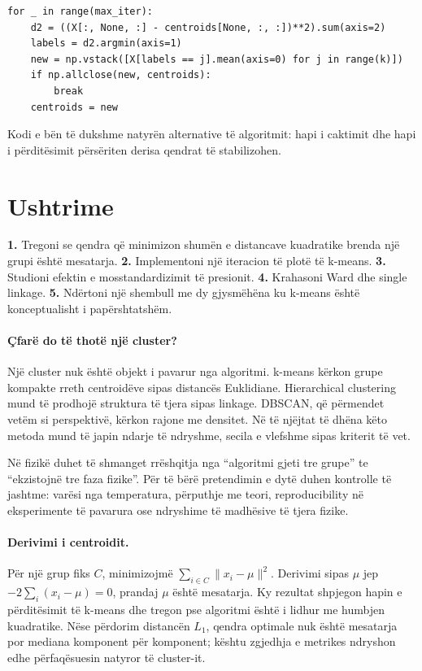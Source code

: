 \documentclass[12pt,a4paper,oneside]{book}
\begin{document}
\begin{lstlisting}
for _ in range(max_iter):
    d2 = ((X[:, None, :] - centroids[None, :, :])**2).sum(axis=2)
    labels = d2.argmin(axis=1)
    new = np.vstack([X[labels == j].mean(axis=0) for j in range(k)])
    if np.allclose(new, centroids):
        break
    centroids = new
\end{lstlisting}
Kodi e bën të dukshme natyrën alternative të algoritmit: hapi i caktimit dhe hapi i përditësimit përsëriten derisa qendrat të stabilizohen.

\section{Ushtrime}

\textbf{1.} Tregoni se qendra që minimizon shumën e distancave kuadratike brenda një grupi është mesatarja. \textbf{2.} Implementoni një iteracion të plotë të k-means. \textbf{3.} Studioni efektin e mosstandardizimit të presionit. \textbf{4.} Krahasoni Ward dhe single linkage. \textbf{5.} Ndërtoni një shembull me dy gjysmëhëna ku k-means është konceptualisht i papërshtatshëm.


\paragraph{Çfarë do të thotë një cluster?}
Një cluster nuk është objekt i pavarur nga algoritmi. k-means kërkon grupe kompakte rreth centroidëve sipas distancës Euklidiane. Hierarchical clustering mund të prodhojë struktura të tjera sipas linkage. DBSCAN, që përmendet vetëm si perspektivë, kërkon rajone me densitet. Në të njëjtat të dhëna këto metoda mund të japin ndarje të ndryshme, secila e vlefshme sipas kriterit të vet.

Në fizikë duhet të shmanget rrëshqitja nga ``algoritmi gjeti tre grupe'' te ``ekzistojnë tre faza fizike''. Për të bërë pretendimin e dytë duhen kontrolle të jashtme: varësi nga temperatura, përputhje me teori, reproducibility në eksperimente të pavarura ose ndryshime të madhësive të tjera fizike.

\paragraph{Derivimi i centroidit.}
Për një grup fiks $C$, minimizojmë $\sum_{i\in C}\|x_i-\mu\|^2$. Derivimi sipas $\mu$ jep $-2\sum_i(x_i-\mu)=0$, prandaj $\mu$ është mesatarja. Ky rezultat shpjegon hapin e përditësimit të k-means dhe tregon pse algoritmi është i lidhur me humbjen kuadratike. Nëse përdorim distancën $L_1$, qendra optimale nuk është mesatarja por mediana komponent për komponent; kështu zgjedhja e metrikes ndryshon edhe përfaqësuesin natyror të cluster-it.
\end{document}
